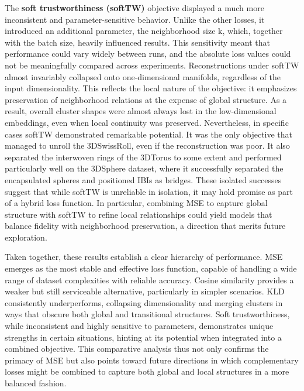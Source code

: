 The \textbf{soft trustworthiness (softTW)} objective displayed a much more inconsistent and parameter-sensitive behavior. Unlike the other losses, it introduced an additional parameter, the neighborhood size k, which, together with the batch size, heavily influenced results. This sensitivity meant that performance could vary widely between runs, and the absolute loss values could not be meaningfully compared across experiments. Reconstructions under softTW almost invariably collapsed onto one-dimensional manifolds, regardless of the input dimensionality. This reflects the local nature of the objective: it emphasizes preservation of neighborhood relations at the expense of global structure. As a result, overall cluster shapes were almost always lost in the low-dimensional embeddings, even when local continuity was preserved. Nevertheless, in specific cases softTW demonstrated remarkable potential. It was the only objective that managed to unroll the 3DSwissRoll, even if the reconstruction was poor. It also separated the interwoven rings of the 3DTorus to some extent and performed particularly well on the 3DSphere dataset, where it successfully separated the encapsulated spheres and positioned IBIs as bridges. These isolated successes suggest that while softTW is unreliable in isolation, it may hold promise as part of a hybrid loss function. In particular, combining MSE to capture global structure with softTW to refine local relationships could yield models that balance fidelity with neighborhood preservation, a direction that merits future exploration.

Taken together, these results establish a clear hierarchy of performance. MSE emerges as the most stable and effective loss function, capable of handling a wide range of dataset complexities with reliable accuracy. Cosine similarity provides a weaker but still serviceable alternative, particularly in simpler scenarios. KLD consistently underperforms, collapsing dimensionality and merging clusters in ways that obscure both global and transitional structures. Soft trustworthiness, while inconsistent and highly sensitive to parameters, demonstrates unique strengths in certain situations, hinting at its potential when integrated into a combined objective. This comparative analysis thus not only confirms the primacy of MSE but also points toward future directions in which complementary losses might be combined to capture both global and local structures in a more balanced fashion.